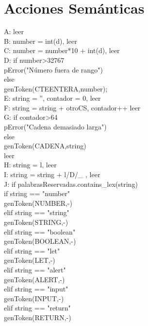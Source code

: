 \documentclass{article}
\begin{document}
\section{Acciones Semánticas}
\begin{flushleft}
A: leer\\
B: number = int(d), leer\\
C: number = number*10 + int(d), leer\\
D: if number>32767\\
       \qquad pError("Número fuera de rango")\\
   \quad else \\
        \qquad genToken(CTEENTERA,number);\\
E: string = '', contador = 0, leer\\
F: string = string + otroCS, contador++ leer\\
G: if contador>64\\
       \qquad pError("Cadena demasiado larga")\\
   \quad else\\
        \qquad genToken(CADENA,string)\\
  \quad leer\\
H: string = l, leer\\
I: string = string + l/D/\_ , leer\\
J: if palabrasReservadas.contains_lex(string)\\
       \qquad if string == "number"\\
      \qquad \quad      genToken(NUMBER,-)\\
       \qquad elif string == "string"\\
       \qquad \quad     genToken(STRING,-)\\
      \qquad  elif string == "boolean"\\
      \qquad \quad      genToken(BOOLEAN,-)\\
    \qquad    elif string == "let"\\
      \qquad \quad      genToken(LET,-)\\
    \qquad    elif string == "alert"\\
      \qquad \quad      genToken(ALERT,-)\\
    \qquad    elif string == "input"\\
      \qquad \quad      genToken(INPUT,-)\\
    \qquad    elif string == "return"\\
     \qquad \quad       genToken(RETURN,-)\\

\end{flushleft}
\end{document}
